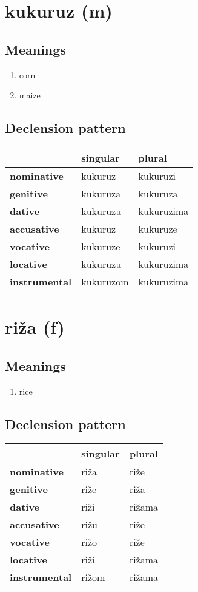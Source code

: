 \filbreak
\section{kukuruz (m)}
\subsection*{Meanings}
\begin{enumerate}
\item corn
\item maize
\end{enumerate}
\subsection*{Declension pattern}
\begin{tabularx}{\linewidth}{Xll}
\toprule
{} &   singular &      plural \\
\midrule
\textbf{nominative  } &    kukuruz &    kukuruzi \\
\textbf{genitive    } &   kukuruza &    kukuruza \\
\textbf{dative      } &   kukuruzu &  kukuruzima \\
\textbf{accusative  } &    kukuruz &    kukuruze \\
\textbf{vocative    } &   kukuruze &    kukuruzi \\
\textbf{locative    } &   kukuruzu &  kukuruzima \\
\textbf{instrumental} &  kukuruzom &  kukuruzima \\
\bottomrule
\end{tabularx}

\filbreak
\section{riža (f)}
\subsection*{Meanings}
\begin{enumerate}
\item rice
\end{enumerate}
\subsection*{Declension pattern}
\begin{tabularx}{\linewidth}{Xll}
\toprule
{} & singular &  plural \\
\midrule
\textbf{nominative  } &     riža &    riže \\
\textbf{genitive    } &     riže &    riža \\
\textbf{dative      } &     riži &  rižama \\
\textbf{accusative  } &     rižu &    riže \\
\textbf{vocative    } &     rižo &    riže \\
\textbf{locative    } &     riži &  rižama \\
\textbf{instrumental} &    rižom &  rižama \\
\bottomrule
\end{tabularx}

